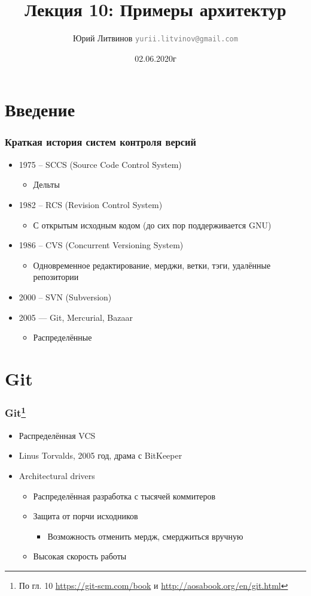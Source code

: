 \documentclass[xetex,mathserif,serif]{beamer}
\title{Лекция 10: Примеры архитектур}
\author[Юрий Литвинов]{Юрий Литвинов \newline \textcolor{gray}{\small\texttt{yurii.litvinov@gmail.com}}}
\date{02.06.2020г}
\begin{document}
	
	\frame{\titlepage}

	\section{Введение}

	\begin{frame}
		\frametitle{Краткая история систем контроля версий}
		\begin{itemize}
			\item 1975 -- SCCS (Source Code Control System)
			\begin{itemize}
				\item Дельты
			\end{itemize}
			\item 1982 -- RCS (Revision Control System)
			\begin{itemize}
				\item С открытым исходным кодом (до сих пор поддерживается GNU)
			\end{itemize}
			\item 1986 -- CVS (Concurrent Versioning System)
			\begin{itemize}
				\item Одновременное редактирование, мерджи, ветки, тэги, удалённые репозитории
			\end{itemize}
			\item 2000 -- SVN (Subversion)
			\item 2005 --- Git, Mercurial, Bazaar
			\begin{itemize}
				\item Распределённые
			\end{itemize}
		\end{itemize}
	\end{frame}

	\section{Git}

	\begin{frame}
		\frametitle{Git\footnote{\tiny{По гл. 10 \url{https://git-scm.com/book} и \url{http://aosabook.org/en/git.html}}}}
		\begin{itemize}
			\item Распределённая VCS
			\item Linus Torvalds, 2005 год, драма с BitKeeper
			\item Architectural drivers
			\begin{itemize}
				\item Распределённая разработка с тысячей коммитеров
				\item Защита от порчи исходников
				\begin{itemize}
					\item Возможность отменить мердж, смерджиться вручную
				\end{itemize}
				\item Высокая скорость работы
			\end{itemize}
		\end{itemize}
	\end{frame}
\end{document}
